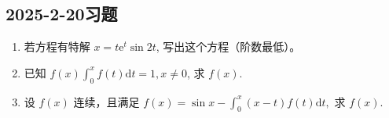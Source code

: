 \subsection{2025-2-20习题}

\begin{enumerate}
    \item 若方程有特解 $x=t\mathrm{e}^{t} \sin{2t}$, 写出这个方程（阶数最低）。
    \item 已知 $f(x)\int^{x}_{0}f(t)\mathrm{d}t=1,x\not=0$, 求 $f(x).$
    \item 设 $f(x)$ 连续，且满足 $f(x)=\sin{x}-\int^{x}_{0}(x-t)f(t)\mathrm{d}t,$ 求 $f(x).$
\end{enumerate}